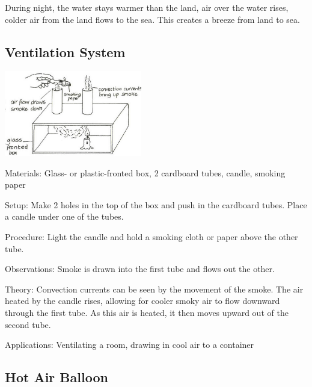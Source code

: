 \begin{multicols}{2}
\begin{description*}
{During night, the water stays warmer than the land, air over the water rises, colder air from the land flows to the sea. This creates a breeze from land to sea.}
\end{description*}

\subsection{Ventilation System}

\begin{center}
\includegraphics[width=0.45\textwidth]{./img/vso/ventilation-system.png}
\end{center}

\begin{description*}
\item[Materials:]{Glass- or plastic-fronted box, 2 cardboard tubes, candle, smoking paper}
\item[Setup:]{Make 2 holes in the top of the box and push in the cardboard tubes. Place a candle under one of the tubes.}
\item[Procedure:]{Light the candle and hold a smoking cloth or paper above the other tube.}
\item[Observations:]{Smoke is drawn into the first tube and flows out the other.}
\item[Theory:]{Convection currents can be seen by the movement of the smoke. The air heated by the candle rises, allowing for cooler smoky air to flow downward through the first tube. As this air is heated, it then moves upward out of the second tube.}
\item[Applications:]{Ventilating a room, drawing in cool air to a container}
\end{description*}

\subsection{Hot Air Balloon}


\end{multicols}
